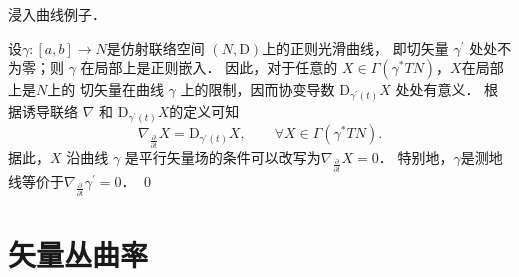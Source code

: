 \begin{example}
    浸入曲线例子．
\end{example}
设$\gamma:[a, b] \rightarrow N$是仿射联络空间 $(N, \mathrm{D})$上的正则光滑曲线，
即切矢量 $\gamma^{\prime}$ 处处不为零；则 $\gamma$ 在局部上是正则嵌入．
因此，对于任意的 $X \in \Gamma(\gamma^* TN)$，$X$在局部上是$N$上的
切矢量在曲线 $\gamma$ 上的限制，因而协变导数 $\mathrm{D}_{\gamma^{\prime}(t)} X$ 处处有意义．
根据诱导联络 $\nabla$ 和 $\mathrm{D}_{\gamma^{\prime}(t)} X$的定义可知
\begin{equation}
    \nabla_{\frac{\partial}{\partial t}} X=\mathrm{D}_{\gamma^{\prime}(t)} X, 
    \qquad \forall X \in \Gamma(\gamma^* T N) .
\end{equation}
据此，$X$ 沿曲线 $\gamma$ 是平行矢量场的条件可以改写为$\nabla_{\frac{\partial}{\partial t}} X=0$．
特别地，$\gamma$是测地线等价于$\nabla_{\frac{\partial}{\partial t}} \gamma^{\prime}=0$．
\qed



\section{矢量丛曲率}\label{chfb:sec_curvature}


